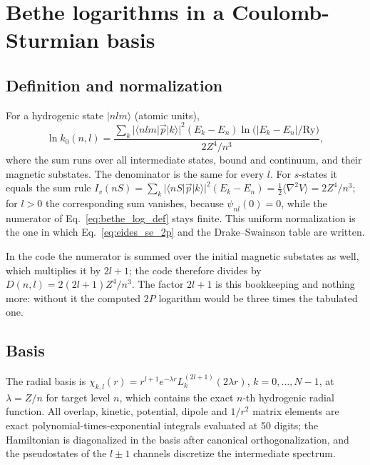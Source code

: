 \documentclass[11pt]{article}
\begin{document}
\section{Bethe logarithms in a Coulomb-Sturmian basis}
\label{sec:bethe}

\subsection{Definition and normalization}

For a hydrogenic state $|nlm\rangle$ (atomic units),
\begin{equation}
\label{eq:bethe_log_def}
\ln k_0(n, l) = \frac{\sum_{k} |\langle nlm | \vec{p} | k \rangle|^2
(E_k - E_{n}) \ln \bigl(|E_k - E_{n}| / \mathrm{Ry}\bigr)}
{2 Z^4 / n^3},
\end{equation}
where the sum runs over all intermediate states, bound and continuum,
and their magnetic substates.  The denominator is the same for every
$l$.  For $s$-states it equals the sum rule
$I_v(nS) = \sum_k |\langle nS | \vec{p} | k \rangle|^2 (E_k - E_n) =
\tfrac12\langle \nabla^2 V \rangle = 2Z^4/n^3$; for $l > 0$ the
corresponding sum vanishes, because $\psi_{nl}(0) = 0$, while the
numerator of Eq.~\eqref{eq:bethe_log_def} stays finite.  This uniform
normalization is the one in which Eq.~\eqref{eq:eides_se_2p} and the
Drake--Swainson table are written.

In the code the numerator is summed over the initial magnetic
substates as well, which multiplies it by $2l + 1$; the code therefore
divides by $D(n,l) = 2(2l+1)Z^4/n^3$.  The factor $2l + 1$ is this
bookkeeping and nothing more: without it the computed $2P$ logarithm
would be three times the tabulated one.

\subsection{Basis}

The radial basis is
$\chi_{k,l}(r) = r^{l+1} e^{-\lambda r} L_k^{(2l+1)}(2 \lambda r)$,
$k = 0, \ldots, N - 1$, at $\lambda = Z/n$ for target level $n$, which
contains the exact $n$-th hydrogenic radial function.  All overlap,
kinetic, potential, dipole and $1/r^2$ matrix elements are exact
polynomial-times-exponential integrals evaluated at 50 digits; the
Hamiltonian is diagonalized in the basis after canonical
orthogonalization, and the pseudostates of the $l \pm 1$ channels
discretize the intermediate spectrum.
\end{document}
